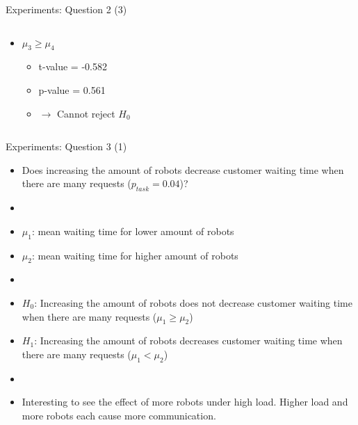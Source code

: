 \begin{frame}{Experiments: Question 2 (3)}
\begin{columns}
\begin{column}{0.5\textwidth}
\begin{itemize}
                \item $\mu_3 \geq \mu_4$
                    \begin{itemize}
                        \item t-value = -0.582
                        \item p-value = 0.561
                        \item $\rightarrow$ Cannot reject $H_0$
                    \end{itemize}
            \end{itemize}
        \end{column}

    \end{columns}
\end{frame}



\begin{frame}{Experiments: Question 3 (1)}
    \begin{itemize}
        \item Does increasing the amount of robots decrease customer waiting time when there are many requests ($p_{task} = 0.04$)?
        \item[]
        \item $\mu_1$: mean waiting time for lower amount of robots
        \item $\mu_2$: mean waiting time for higher amount of robots
        \item[]
        \item $H_0$: Increasing the amount of robots does not decrease customer waiting time when there are many requests ($\mu_1 \geq \mu_2$)
        \item $H_1$: Increasing the amount of robots decreases customer waiting time when there are many requests ($\mu_1 < \mu_2$)
        \item[]
        \item Interesting to see the effect of more robots under high load. Higher load and more robots each cause more communication.
    \end{itemize}
\end{frame}

